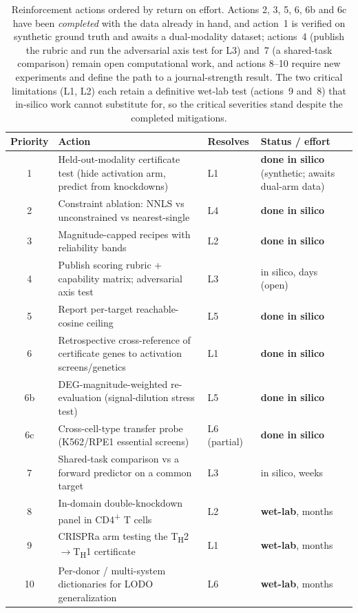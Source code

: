 \documentclass[11pt]{article}
\newcommand{\Th}[1]{T\textsubscript{H}#1}
\newcommand{\sev}[2]{\textcolor{#1}{\textbf{#2}}}
\begin{document}
\begin{table}[h]
\centering
\small
\renewcommand{\arraystretch}{1.3}
\begin{tabularx}{\textwidth}{@{}c X l l@{}}
\toprule
\textbf{Priority} & \textbf{Action} & \textbf{Resolves} & \textbf{Status / effort} \\
\midrule
1 & Held-out-modality certificate test (hide activation arm, predict from knockdowns) & L1 & \sev{sev3}{done in silico} (synthetic; awaits dual-arm data) \\
2 & Constraint ablation: NNLS vs unconstrained vs nearest-single & L4 & \sev{sev3}{done in silico} \\
3 & Magnitude-capped recipes with reliability bands & L2 & \sev{sev3}{done in silico} \\
4 & Publish scoring rubric + capability matrix; adversarial axis test & L3 & in silico, days (open) \\
5 & Report per-target reachable-cosine ceiling & L5 & \sev{sev3}{done in silico} \\
6 & Retrospective cross-reference of certificate genes to activation screens/genetics & L1 & \sev{sev3}{done in silico} \\
6b & DEG-magnitude-weighted re-evaluation (signal-dilution stress test) & L5 & \sev{sev3}{done in silico} \\
6c & Cross-cell-type transfer probe (K562/RPE1 essential screens) & L6 (partial) & \sev{sev3}{done in silico} \\
7 & Shared-task comparison vs a forward predictor on a common target & L3 & in silico, weeks \\
8 & In-domain double-knockdown panel in CD4\textsuperscript{+} T cells & L2 & \textbf{wet-lab}, months \\
9 & CRISPRa arm testing the \Th{2}$\rightarrow$\Th{1} certificate & L1 & \textbf{wet-lab}, months \\
10 & Per-donor / multi-system dictionaries for LODO generalization & L6 & \textbf{wet-lab}, months \\
\bottomrule
\end{tabularx}
\caption{Reinforcement actions ordered by return on effort. Actions 2, 3, 5, 6, 6b and 6c have
been \emph{completed} with the data already in hand, and action~1 is verified on synthetic
ground truth and awaits a dual-modality dataset; actions~4 (publish the rubric and run the
adversarial axis test for L3) and~7 (a shared-task comparison) remain open computational work,
and actions 8--10 require new experiments and define the path to a journal-strength result. The
two critical limitations (L1, L2) each retain a definitive wet-lab test (actions~9 and~8) that
in-silico work cannot substitute for, so the critical severities stand despite the completed
mitigations.}
\label{tab:roadmap}
\end{table}
\end{document}

